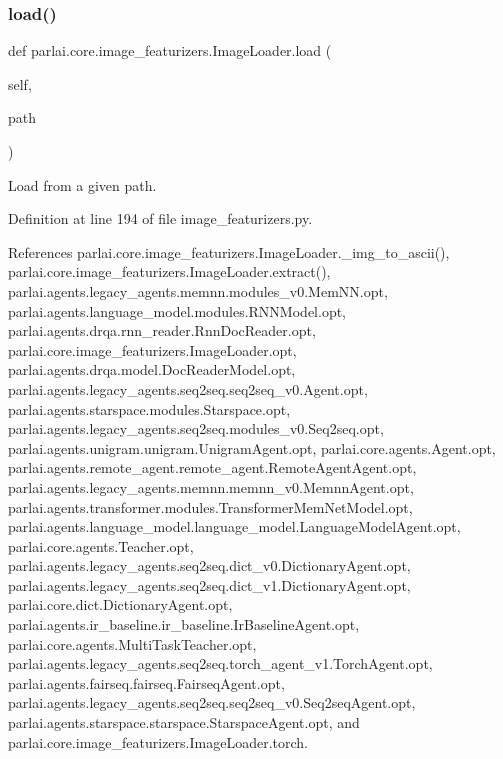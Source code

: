 \subsubsection{\texorpdfstring{load()}{load()}}
{\footnotesize\ttfamily def parlai.\+core.\+image\+\_\+featurizers.\+Image\+Loader.\+load (\begin{DoxyParamCaption}\item[{}]{self,  }\item[{}]{path }\end{DoxyParamCaption})}

\begin{DoxyVerb}Load from a given path.\end{DoxyVerb}
 

Definition at line 194 of file image\+\_\+featurizers.\+py.



References parlai.\+core.\+image\+\_\+featurizers.\+Image\+Loader.\+\_\+img\+\_\+to\+\_\+ascii(), parlai.\+core.\+image\+\_\+featurizers.\+Image\+Loader.\+extract(), parlai.\+agents.\+legacy\+\_\+agents.\+memnn.\+modules\+\_\+v0.\+Mem\+N\+N.\+opt, parlai.\+agents.\+language\+\_\+model.\+modules.\+R\+N\+N\+Model.\+opt, parlai.\+agents.\+drqa.\+rnn\+\_\+reader.\+Rnn\+Doc\+Reader.\+opt, parlai.\+core.\+image\+\_\+featurizers.\+Image\+Loader.\+opt, parlai.\+agents.\+drqa.\+model.\+Doc\+Reader\+Model.\+opt, parlai.\+agents.\+legacy\+\_\+agents.\+seq2seq.\+seq2seq\+\_\+v0.\+Agent.\+opt, parlai.\+agents.\+starspace.\+modules.\+Starspace.\+opt, parlai.\+agents.\+legacy\+\_\+agents.\+seq2seq.\+modules\+\_\+v0.\+Seq2seq.\+opt, parlai.\+agents.\+unigram.\+unigram.\+Unigram\+Agent.\+opt, parlai.\+core.\+agents.\+Agent.\+opt, parlai.\+agents.\+remote\+\_\+agent.\+remote\+\_\+agent.\+Remote\+Agent\+Agent.\+opt, parlai.\+agents.\+legacy\+\_\+agents.\+memnn.\+memnn\+\_\+v0.\+Memnn\+Agent.\+opt, parlai.\+agents.\+transformer.\+modules.\+Transformer\+Mem\+Net\+Model.\+opt, parlai.\+agents.\+language\+\_\+model.\+language\+\_\+model.\+Language\+Model\+Agent.\+opt, parlai.\+core.\+agents.\+Teacher.\+opt, parlai.\+agents.\+legacy\+\_\+agents.\+seq2seq.\+dict\+\_\+v0.\+Dictionary\+Agent.\+opt, parlai.\+agents.\+legacy\+\_\+agents.\+seq2seq.\+dict\+\_\+v1.\+Dictionary\+Agent.\+opt, parlai.\+core.\+dict.\+Dictionary\+Agent.\+opt, parlai.\+agents.\+ir\+\_\+baseline.\+ir\+\_\+baseline.\+Ir\+Baseline\+Agent.\+opt, parlai.\+core.\+agents.\+Multi\+Task\+Teacher.\+opt, parlai.\+agents.\+legacy\+\_\+agents.\+seq2seq.\+torch\+\_\+agent\+\_\+v1.\+Torch\+Agent.\+opt, parlai.\+agents.\+fairseq.\+fairseq.\+Fairseq\+Agent.\+opt, parlai.\+agents.\+legacy\+\_\+agents.\+seq2seq.\+seq2seq\+\_\+v0.\+Seq2seq\+Agent.\+opt, parlai.\+agents.\+starspace.\+starspace.\+Starspace\+Agent.\+opt, and parlai.\+core.\+image\+\_\+featurizers.\+Image\+Loader.\+torch.



